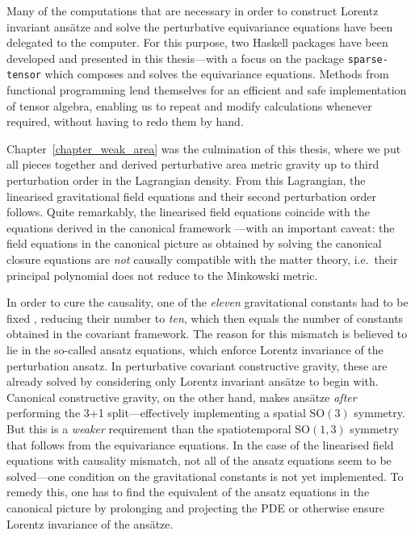 Many of the computations that are necessary in order to construct Lorentz invariant ansätze and solve the perturbative equivariance equations have been delegated to the computer. For this purpose, two Haskell packages have been developed and presented in this thesis---with a focus on the package \texttt{sparse-tensor} which composes and solves the equivariance equations. Methods from functional programming lend themselves for an efficient and safe implementation of tensor algebra, enabling us to repeat and modify calculations whenever required, without having to redo them by hand.

Chapter~\ref{chapter_weak_area} was the culmination of this thesis, where we put all pieces together and derived perturbative area metric gravity up to third perturbation order in the Lagrangian density. From this Lagrangian, the linearised gravitational field equations and their second perturbation order follows. Quite remarkably, the linearised field equations coincide with the equations derived in the canonical framework \cite{Schneider_2017,Alex_2019}---with an important caveat: the field equations in the canonical picture as obtained by solving the canonical closure equations \cite{D_ll_2018,Schneider_2017} are \emph{not} causally compatible with the matter theory, i.e.\ their principal polynomial does not reduce to the Minkowski metric.

In order to cure the causality, one of the \emph{eleven} gravitational constants had to be fixed \cite{Alex_2019}, reducing their number to \emph{ten}, which then equals the number of constants obtained in the covariant framework. The reason for this mismatch is believed to lie in the so-called ansatz equations, which enforce Lorentz invariance of the perturbation ansatz. In perturbative covariant constructive gravity, these are already solved by considering only Lorentz invariant ansätze to begin with. Canonical constructive gravity, on the other hand, makes ansätze \emph{after} performing the 3+1 split---effectively implementing a spatial $\mathrm{SO}(3)$ symmetry. But this is a \emph{weaker} requirement than the spatiotemporal $\mathrm{SO}(1,3)$ symmetry that follows from the equivariance equations. In the case of the linearised field equations with causality mismatch, not all of the ansatz equations seem to be solved---one condition on the gravitational constants is not yet implemented. To remedy this, one has to find the equivalent of the ansatz equations in the canonical picture by prolonging and projecting the PDE or otherwise ensure Lorentz invariance of the ansätze.

